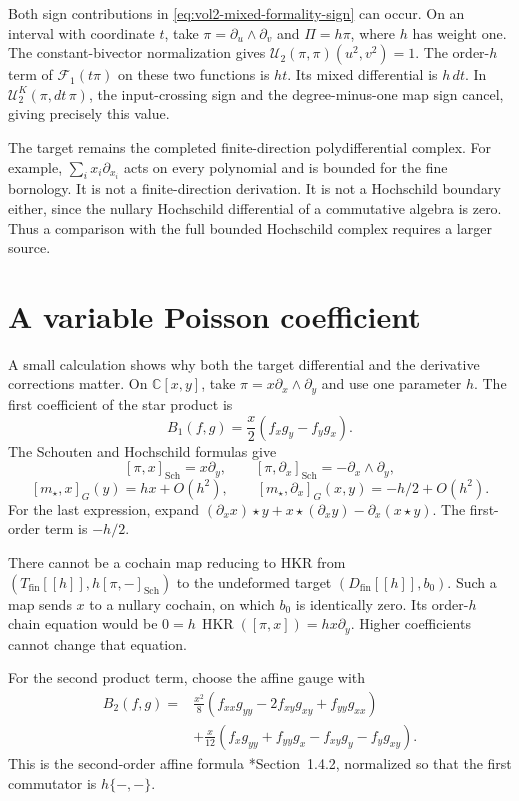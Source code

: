 Both sign contributions in
\eqref{eq:vol2-mixed-formality-sign} can occur.
On an interval with coordinate $t$, take
$\pi=\partial_u\wedge\partial_v$ and $\Pi=h\pi$,
where $h$ has weight one.
The constant-bivector normalization gives
$\mathcal U_2(\pi,\pi)(u^2,v^2)=1$.
The order-$h$ term of $\mathcal F_1(t\pi)$ on
these two functions is $ht$.
Its mixed differential is $h\,dt$.
In $\mathcal U_2^K(\pi,dt\,\pi)$, the input-crossing
sign and the degree-minus-one map sign cancel,
giving precisely this value.

The target remains the completed finite-direction
polydifferential complex.
For example,
$\sum_i x_i\partial_{x_i}$ acts on every polynomial
and is bounded for the fine bornology.
It is not a finite-direction derivation.
It is not a Hochschild boundary either, since
the nullary Hochschild differential of a
commutative algebra is zero.
Thus a comparison with the full bounded
Hochschild complex requires a larger source.

\section{A variable Poisson coefficient}
\label{sec:vol2-variable-poisson-test}

A small calculation shows why both the target differential
and the derivative corrections matter.
On $\mathbb C[x,y]$, take
$\pi=x\partial_x\wedge\partial_y$ and use one
parameter $h$.
The first coefficient of the star product is
\[
 B_1(f,g)=\frac{x}{2}(f_xg_y-f_yg_x).
\]
The Schouten and Hochschild formulas give
\[
 [\pi,x]_{\mathrm{Sch}}=x\partial_y,\qquad
 [\pi,\partial_x]_{\mathrm{Sch}}
       =-\partial_x\wedge\partial_y,
\]
\[
 [m_\star,x]_G(y)=hx+O(h^2),\qquad
 [m_\star,\partial_x]_G(x,y)=-h/2+O(h^2).
\]
For the last expression, expand
$(\partial_xx)\star y+x\star(\partial_xy)
 -\partial_x(x\star y)$.
The first-order term is $-h/2$.

There cannot be a cochain map reducing to HKR from
$(T_{\mathrm{fin}}[[h]],h[\pi,-]_{\mathrm{Sch}})$
to the undeformed target
$(D_{\mathrm{fin}}[[h]],b_0)$.
Such a map sends $x$ to a nullary cochain, on which
$b_0$ is identically zero.
Its order-$h$ chain equation would be
$0=h\,\operatorname{HKR}([\pi,x])=hx\partial_y$.
Higher coefficients cannot change that equation.

For the second product term, choose the affine gauge
with
\begin{equation}\label{eq:vol2-variable-poisson-second-term}
 \begin{split}
 B_2(f,g)={}&\frac{x^2}{8}
       (f_{xx}g_{yy}-2f_{xy}g_{xy}+f_{yy}g_{xx})\\
 &+\frac{x}{12}
       (f_xg_{yy}+f_{yy}g_x-f_{xy}g_y-f_yg_{xy}).
 \end{split}
\end{equation}
This is the second-order affine formula
\cite{KontsevichDQ}*{Section~1.4.2}, normalized so
that the first commutator is $h\{-,-\}$.

